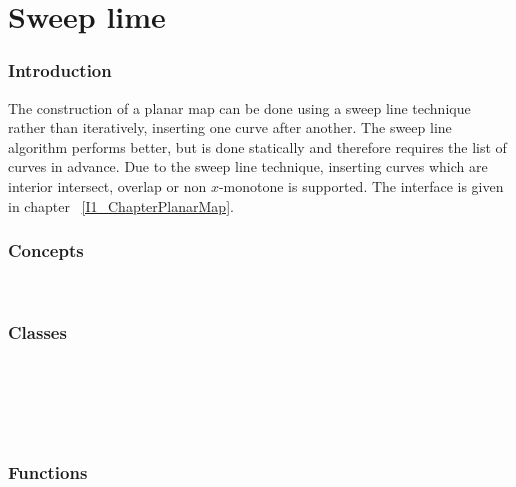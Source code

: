 \chapter{Sweep lime}

\subsection*{Introduction}
The construction of a planar map can be done using a sweep line
technique rather than iteratively, inserting one curve after another.
The sweep line algorithm performs better, but is done statically and
therefore requires the list of curves in advance.  Due to the sweep
line technique, inserting curves which are interior intersect,
overlap or non $x$-monotone is supported. The interface is given in
chapter ~\ref{I1_ChapterPlanarMap}.

\begin{ccTexOnly}

\subsection*{Concepts}
\\

\subsection*{Classes}
\\
\\
\\
\\

\subsection*{Functions}
\\
\\
\\

\end{ccTexOnly}    
